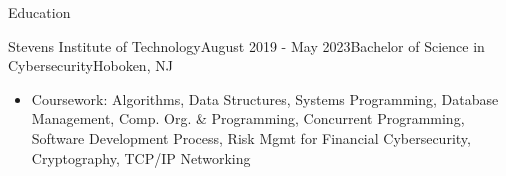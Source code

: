 \documentclass{resume} %
\begin{document}
 
\begin{rSection}{Education}

\begin{rSubsection}
    {Stevens Institute of Technology}{August 2019 - May 2023}{Bachelor of Science in Cybersecurity}{Hoboken, NJ}
    \renewcommand\labelitemi{$\vcenter{\hbox{\tiny$\bullet$}}$}
\item[] \begin{itemize}
    \item Coursework: Algorithms, Data Structures, Systems Programming, Database Management, Comp. Org. \& Programming, Concurrent Programming, Software Development Process, Risk Mgmt for Financial Cybersecurity, Cryptography, TCP/IP Networking

    \vspace{-1mm}
\end{itemize}
\end{rSubsection}
\vspace{-1mm}
\end{rSection}
\vspace{-1mm}
\end{document}
